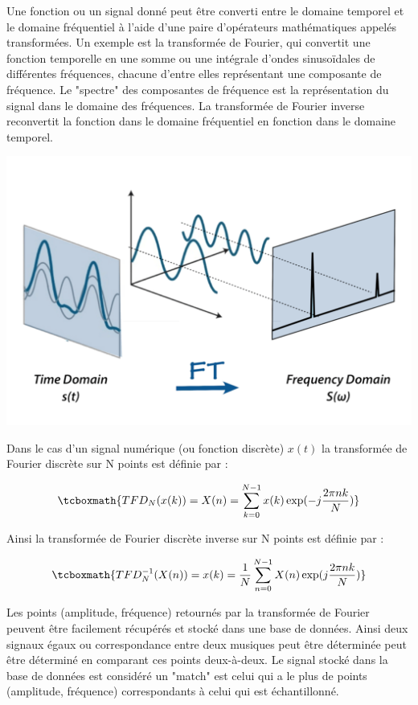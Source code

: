 \documentclass[11pt, report, french]{scrreprt}
\begin{document}
Une fonction ou un signal donné peut être converti entre le domaine temporel et le domaine fréquentiel à l'aide d'une paire d'opérateurs mathématiques appelés transformées. Un exemple est la transformée de Fourier, qui convertit une fonction temporelle en une somme ou une intégrale d'ondes sinusoïdales de différentes fréquences, chacune d'entre elles représentant une composante de fréquence. Le "spectre" des composantes de fréquence est la représentation du signal dans le domaine des fréquences. La transformée de Fourier inverse reconvertit la fonction dans le domaine fréquentiel en fonction dans le domaine temporel. \\

\begin{center}
	\includegraphics[scale=0.22]{img/fft.png}
\end{center}

Dans le cas d'un signal numérique (ou fonction discrète) $x(t)$ la transformée de Fourier discrète sur N points est définie par :

\begin{equation}
\tcboxmath{ TFD_N( x(k) ) = X(n) = \sum_{k=0}^{N-1} x(k) \exp(-j \frac{2\pi nk}{N} ) }
\end{equation}

\vspace{0.5cm}
Ainsi la transformée de Fourier discrète inverse sur N points est définie par :

\begin{equation}
\tcboxmath{ TFD_N^{-1}( X(n) ) = x(k) = \frac{1}{N} \sum_{n=0}^{N-1} X(n) \exp( j \frac{2\pi nk}{N} ) }
\end{equation}

\vspace{0.5cm}
Les points (amplitude, fréquence) retournés par la transformée de Fourier peuvent être facilement récupérés et stocké dans une base de données. Ainsi deux signaux égaux ou correspondance entre deux musiques peut être déterminée peut être déterminé en comparant ces points deux-à-deux. Le signal stocké dans la base de données est considéré un "match" est celui qui a le plus de points (amplitude, fréquence) correspondants à celui qui est échantillonné.\\\par
\end{document}
